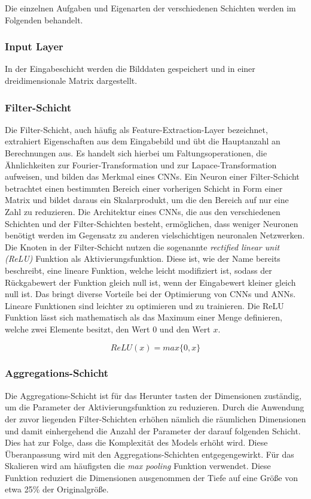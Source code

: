 Die einzelnen Aufgaben und Eigenarten der verschiedenen Schichten werden im Folgenden behandelt.

\subsubsection{Input Layer}
In der Eingabeschicht werden die Bilddaten gespeichert und in einer dreidimensionale Matrix dargestellt.\cite*{Sewak2018}

\subsubsection{Filter-Schicht}
Die Filter-Schicht, auch häufig als Feature-Extraction-Layer bezeichnet, extrahiert Eigenschaften aus dem Eingabebild und übt die Hauptanzahl an Berechnungen aus. 
Es handelt sich hierbei um Faltungsoperationen, die Ähnlichkeiten zur Fourier-Transformation und zur Lapace-Transformation aufweisen, und bilden das Merkmal eines CNNs.
Ein Neuron einer Filter-Schicht betrachtet einen bestimmten Bereich einer vorherigen Schicht in Form einer Matrix und bildet daraus ein Skalarprodukt, um die den Bereich auf nur eine Zahl zu reduzieren.
Die Architektur eines CNNs, die aus den verschiedenen Schichten und der Filter-Schichten besteht, ermöglichen, dass weniger Neuronen benötigt werden im Gegensatz zu anderen vielschichtigen neuronalen Netzwerken.\cite*{Sewak2018}
Die Knoten in der Filter-Schicht nutzen die sogenannte \textit{rectified linear unit (ReLU)} Funktion als Aktivierungsfunktion. Diese ist, wie der Name bereits beschreibt, eine lineare Funktion, welche leicht modifiziert ist, sodass der Rückgabewert der Funktion gleich null ist, wenn der Eingabewert kleiner gleich null ist. Das bringt diverse Vorteile bei der Optimierung von CNNs und ANNs. Lineare Funktionen sind leichter zu optimieren und zu trainieren. Die ReLU Funktion lässt sich mathematisch als das Maximum einer Menge definieren, welche zwei Elemente besitzt, den Wert $0$ und den Wert $x$.

\[ReLU(x) = max\{0, x\}\] \cite*{goodfellow2016}

\subsubsection{Aggregations-Schicht}
Die Aggregations-Schicht ist für das Herunter tasten der Dimensionen zuständig, um die Parameter der Aktivierungsfunktion zu reduzieren. Durch die Anwendung der zuvor liegenden Filter-Schichten erhöhen nämlich die räumlichen Dimensionen und damit einhergehend die Anzahl der Parameter der darauf folgenden Schicht. Dies hat zur Folge, dass die Komplexität des Models erhöht wird. Diese Überanpassung wird mit den Aggregations-Schichten entgegengewirkt.\cite*{Sewak2018}
Für das Skalieren wird am häufigsten die \textit{max pooling} Funktion verwendet. Diese Funktion reduziert die Dimensionen ausgenommen der Tiefe auf eine Größe von etwa 25\% der Originalgröße.\cite*{Keiron2015}

